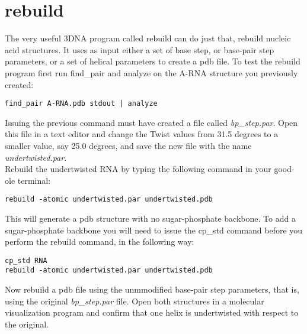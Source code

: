 \section{rebuild}
The very useful 3DNA  program called  \textrm{rebuild} can  do just
that, rebuild nucleic acid structures. It uses as input either a set of base
step, or base-pair step parameters, or a set of helical parameters to
create a pdb file.
To  test  the  rebuild   program  first  run  \textrm{find\_pair}  and
\textrm{analyze} on the A-RNA structure you previously created:
\begin{Verbatim}
find_pair A-RNA.pdb stdout | analyze
\end{Verbatim}
Issuing  the previous command must  have created  a file called
\textit{bp\_step.par}.
Open this file in a text editor and change the Twist values from 31.5 degrees
to a smaller value, say 25.0 degrees, and save the new file with the name
\textit{undertwisted.par}.\\
Rebuild the undertwisted RNA by typing the following command in your good-ole
terminal:
\begin{Verbatim}
rebuild -atomic undertwisted.par undertwisted.pdb
\end{Verbatim}
This   will  generate   a  pdb   structure  with   no  sugar-phosphate
backbone. To add a sugar-phosphate backbone you will need to issue the
\textrm{cp\_std}  command  before   you  perform  the  \textrm{rebuild}
command, in the following way:
\begin{Verbatim}
cp_std RNA
rebuild -atomic undertwisted.par undertwisted.pdb
\end{Verbatim} 
Now rebuild a  pdb file using the unmmodified base-pair
step  parameters, that  is, using  the  original \textit{bp\_step.par}
file. Open  both structures in  a molecular visualization  program and
confirm that one helix is undertwisted with respect to the original.

